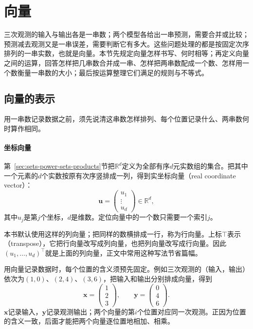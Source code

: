 
\section{向量}
\label{sec:ls-vectors}
\label{sec:ls-objects}
\label{sec:linear-algebra-objects}
\label{sec:linear-algebra-space-representations}
\label{sec:prelim-vectors-matrices}

三次观测的输入与输出各是一串数；两个模型各给出一串预测，需要合并或比较；预测减去观测又是一串误差，需要判断它有多大。这些问题处理的都是按固定次序排列的一串实数，也就是向量。本节先规定向量怎样书写、何时相等；再定义向量之间的运算，回答怎样把几串数合并成一串、怎样把两串数配成一个数、怎样用一个数衡量一串数的大小；最后按运算整理它们满足的规则与不等式。

\subsection{向量的表示}
\label{sec:ls-vector-representation}
\label{sec:prelim-vector-records}

用一串数记录数据之前，须先说清这串数怎样排列、每个位置记录什么、两串数何时算作相同。

\paragraph{坐标向量}
第~\ref{sec:sets-power-sets-products}节把$\mathbb R^d$定义为全部有序$d$元实数组的集合。把其中一个元素的$d$个实数按原有次序竖排成一列，得到实坐标向量（real coordinate vector）：
\[
 \bm u=\begin{pmatrix}u_1\\\vdots\\u_d\end{pmatrix}\in\mathbb R^d,
\]
其中$u_j$是第$j$个坐标，$d$是维数。定位向量中的一个数只需要一个索引$j$。

本书默认使用这样的列向量；把同样的数横排成一行，称为行向量。上标$\top$表示（transpose），它把行向量改写成列向量，也把列向量改写成行向量。因此$(u_1,\ldots,u_d)^\top$就是上面的列向量，正文中常用这种写法节省篇幅。

用向量记录数据时，每个位置的含义须预先固定。例如三次观测的（输入，输出）依次为$(1,0)$、$(2,4)$、$(3,6)$，把输入和输出分别排成向量，得到
\[
 \bm x=\begin{pmatrix}1\\2\\3\end{pmatrix},\qquad
 \bm y=\begin{pmatrix}0\\4\\6\end{pmatrix}.
\]
$\bm x$记录输入，$\bm y$记录观测输出；两个向量的第$i$个位置对应同一次观测。正因为位置的含义一致，后面才能把两个向量逐位置地相加、相乘。

